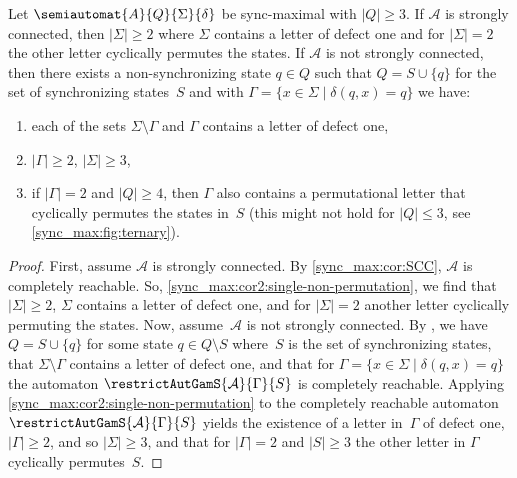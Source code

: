 \begin{corollary}
	\label{sync_max:cor:structure_letters}
	Let $\semiautomat{A}{Q}{\Sigma}{\delta}$ be sync-maximal with $|Q| \ge 3$.
	If $\mathcal A$ is strongly connected, then $|\Sigma| \ge 2$
	where $\Sigma$ contains a letter of defect one
	and for $|\Sigma| = 2$ the other letter cyclically permutes the states. 
	If $\mathcal A$ is not strongly connected,
	then there exists a non-synchronizing state $q \in Q$
	such that $Q = S \cup \{q\}$ for the set of synchronizing states~$S$
	and with $\Gamma = \{ x \in \Sigma \mid \delta(q, x) = q \}$ we have:
	\begin{enumerate}
		\item \label{sync_max:cor:structure_letters:1} 
		each of the sets $\Sigma \setminus \Gamma$ and $\Gamma$ contains a letter of defect one,
				
		\item $|\Gamma| \ge 2$, $|\Sigma| \ge 3$,
		
		\item \label{sync_max:cor:structure_letters:3} if $|\Gamma| = 2$ and $|Q| \ge 4$, then
		$\Gamma$ also contains a permutational letter
		that cyclically permutes the states in~$S$ (this might not hold for $|Q| \le 3$, see \cref{sync_max:fig:ternary}). 
	\end{enumerate}
\end{corollary}
\begin{proof}
	First, assume $\mathcal A$ is strongly connected.
	By \cref{sync_max:cor:SCC}, $\mathcal A$
	is completely reachable.
	So, \cref{sync_max:cor2:single-non-permutation},
	we find that $|\Sigma| \ge 2$, $\Sigma$ contains a letter
	of defect one, and for $|\Sigma| = 2$ another letter cyclically permuting the states.
	Now, assume~$\mathcal A$ is not strongly connected.
	By , 
	we have $Q = S \cup \{q\}$ for some state $q \in Q \setminus S$ where~$S$
	is the set of synchronizing states,
	that  $\Sigma \setminus \Gamma$ contains a letter of defect one,
	and that for $\Gamma = \{x\in \Sigma \mid \delta(q, x) = q \}$
	the automaton $\restrictAutGamS{\mathcal A}{\Gamma}{S}$
	is completely reachable.
	Applying \cref{sync_max:cor2:single-non-permutation}
	to the completely reachable automaton $\restrictAutGamS{\mathcal A}{\Gamma}{S}$
	yields the existence of a letter %
	in~$\Gamma$
	of defect one, $|\Gamma| \ge 2$, and so $|\Sigma| \ge 3$,
	and that for $|\Gamma| = 2$ and $|S| \ge 3$ the other letter in $\Gamma$ cyclically permutes~$S$.
\end{proof}